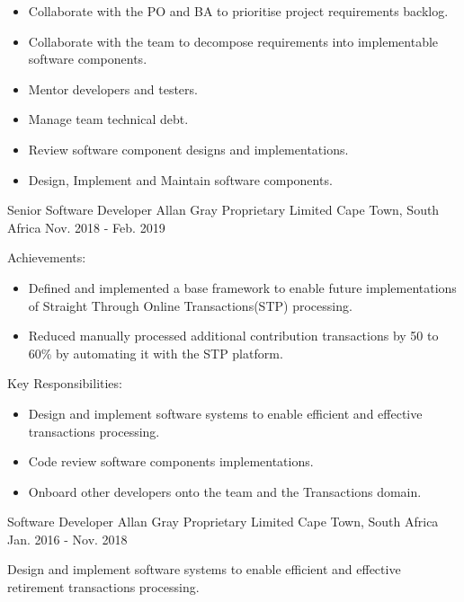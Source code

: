 \begin{cventries}
{\begin{cvitems}
\begin{itemize}
          \item {Collaborate with the PO and BA to prioritise project requirements backlog.}
          \item {Collaborate with the team to decompose requirements into implementable software components.}
          \item {Mentor developers and testers.}
          \item {Manage team technical debt.}
          \item {Review software component designs and implementations.}
          \item {Design, Implement and Maintain software components.}
        \end{itemize}
      \end{cvitems}
    }

  \cventry
    {Senior Software Developer} %
    {Allan Gray Proprietary Limited} %
    {Cape Town, South Africa} %
    {Nov. 2018 - Feb. 2019} %
    {
      \begin{cvitems} %
        \item {Achievements:}
        \begin{itemize}
          \item {Defined and implemented a base framework to enable future implementations of Straight Through Online Transactions(STP) processing.}
          \item {Reduced manually processed additional contribution transactions by 50 to 60\% by automating it with the STP platform.}
        \end{itemize}
        \item {Key Responsibilities:}
        \begin{itemize}
          \item {Design and implement software systems to enable efficient and effective transactions processing.}
          \item {Code review software components implementations.}
          \item {Onboard other developers onto the team and the Transactions domain.}
        \end{itemize}
      \end{cvitems}
    }

  \cventry
    {Software Developer} %
    {Allan Gray Proprietary Limited} %
    {Cape Town, South Africa} %
    {Jan. 2016 - Nov. 2018} %
    {
      \begin{cvitems} %
          \item {Design and implement software systems to enable efficient and effective retirement transactions processing.}
      \end{cvitems}
    }


\end{cventries}
